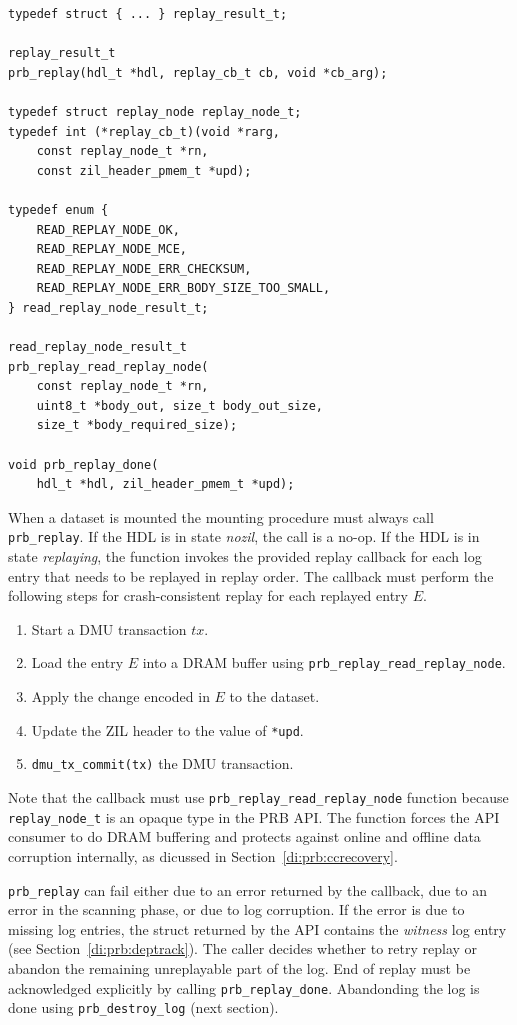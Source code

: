 \documentclass[12pt,a4paper,twoside]{book}
\begin{document}
\begin{lstlisting}
typedef struct { ... } replay_result_t;

replay_result_t
prb_replay(hdl_t *hdl, replay_cb_t cb, void *cb_arg);

typedef struct replay_node replay_node_t;
typedef int (*replay_cb_t)(void *rarg,
    const replay_node_t *rn,
    const zil_header_pmem_t *upd);

typedef enum {
	READ_REPLAY_NODE_OK,
	READ_REPLAY_NODE_MCE,
	READ_REPLAY_NODE_ERR_CHECKSUM,
	READ_REPLAY_NODE_ERR_BODY_SIZE_TOO_SMALL,
} read_replay_node_result_t;

read_replay_node_result_t
prb_replay_read_replay_node(
    const replay_node_t *rn,
    uint8_t *body_out, size_t body_out_size,
    size_t *body_required_size);

void prb_replay_done(
    hdl_t *hdl, zil_header_pmem_t *upd);

\end{lstlisting}

When a dataset is mounted the mounting procedure must always call \lstinline{prb_replay}.
If the HDL is in state \textit{nozil}, the call is a no-op.
If the HDL is in state \textit{replaying}, the function invokes the provided replay callback for each log entry that needs to be replayed in replay order.
The callback must perform the following steps for crash-consistent replay for each replayed entry $E$.
\begin{enumerate}[noitemsep]
    \item Start a DMU transaction $tx$.
    \item Load the entry $E$ into a DRAM buffer using \lstinline{prb_replay_read_replay_node}.
    \item Apply the change encoded in $E$ to the dataset.
    \item Update the ZIL header to the value of \lstinline{*upd}.
    \item \lstinline{dmu_tx_commit(tx)} the DMU transaction.
\end{enumerate}

Note that the callback must use \lstinline{prb_replay_read_replay_node} function because \lstinline{replay_node_t} is an opaque type in the PRB API.
The function forces the API consumer to do DRAM buffering and protects against online and offline data corruption internally, as dicussed in Section~\ref{di:prb:ccrecovery}.

\lstinline{prb_replay} can fail either due to an error returned by the callback, due to an error in the scanning phase, or due to log corruption.
If the error is due to missing log entries, the struct returned by the API contains the \textit{witness} log entry (see Section~\ref{di:prb:deptrack}).
The caller decides whether to retry replay or abandon the remaining unreplayable part of the log.
End of replay must be acknowledged explicitly by calling \lstinline{prb_replay_done}.
Abandonding the log is done using \lstinline{prb_destroy_log} (next section).
\end{document}
